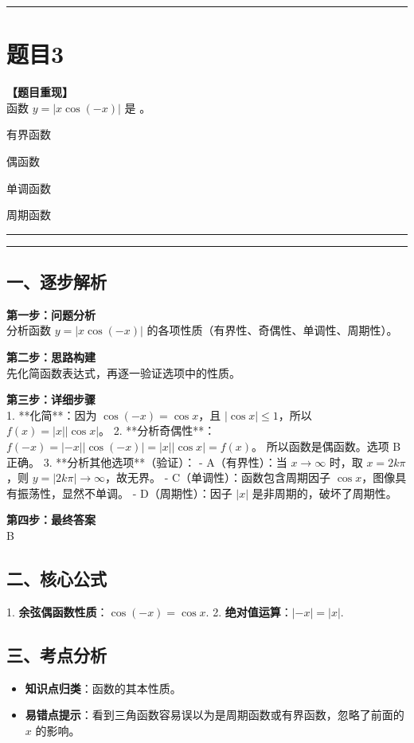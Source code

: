 \documentclass[12pt, a4paper]{ctexart}
\newcommand{\TopSeparator}{
    \par\noindent\rule{\textwidth}{1.5pt}\vspace{0.5em} %
}
\newcommand{\AnalysisSeparator}{
    \par\noindent\rule{\textwidth}{0.5pt}\vspace{0.2em}\hrule\vspace{0.5em} %
}
\newenvironment{RedAnalysis}{
    \par
    \color{red} %
}{
    \par
    \color{black} %
}
\newcommand{\choicesFour}[4]{
    \begin{enumerate}[label=\Alph*., itemsep=0pt, parsep=0pt, topsep=5pt, labelsep=0.5em]
        \begin{minipage}{0.22\linewidth} \item #1 \end{minipage}
        \begin{minipage}{0.22\linewidth} \item #2 \end{minipage}
        \begin{minipage}{0.22\linewidth} \item #3 \end{minipage}
        \begin{minipage}{0.22\linewidth} \item #4 \end{minipage}
    \end{enumerate}
}
\begin{document}
\vspace{2em}

\TopSeparator
\section*{题目3}

\textbf{【题目重现】} \\
函数 $ y = |x \cos(-x)| $ 是 \underline{\hspace{1cm}}。
\choicesFour{有界函数}{偶函数}{单调函数}{周期函数}

\AnalysisSeparator

\begin{RedAnalysis}

\subsection*{一、逐步解析}

\textbf{第一步：问题分析} \\
分析函数 $y = |x \cos(-x)|$ 的各项性质（有界性、奇偶性、单调性、周期性）。

\textbf{第二步：思路构建} \\
先化简函数表达式，再逐一验证选项中的性质。

\textbf{第三步：详细步骤} \\
1. **化简**：因为 $\cos(-x) = \cos x$，且 $|\cos x| \le 1$，所以 $f(x) = |x| |\cos x|$。
2. **分析奇偶性**：
   $f(-x) = |-x| |\cos(-x)| = |x| |\cos x| = f(x)$。
   所以函数是偶函数。选项 B 正确。
3. **分析其他选项**（验证）：
   - A（有界性）：当 $x \to \infty$ 时，取 $x=2k\pi$，则 $y = |2k\pi| \to \infty$，故无界。
   - C（单调性）：函数包含周期因子 $\cos x$，图像具有振荡性，显然不单调。
   - D（周期性）：因子 $|x|$ 是非周期的，破坏了周期性。

\textbf{第四步：最终答案} \\
B

\subsection*{二、核心公式}
1. \textbf{余弦偶函数性质}：$\cos(-x) = \cos x$.
2. \textbf{绝对值运算}：$|-x| = |x|$.

\subsection*{三、考点分析}
\begin{itemize}
    \item \textbf{知识点归类}：函数的其本性质。
    \item \textbf{易错点提示}：看到三角函数容易误以为是周期函数或有界函数，忽略了前面的 $x$ 的影响。
\end{itemize}

\end{RedAnalysis}
\end{document}
